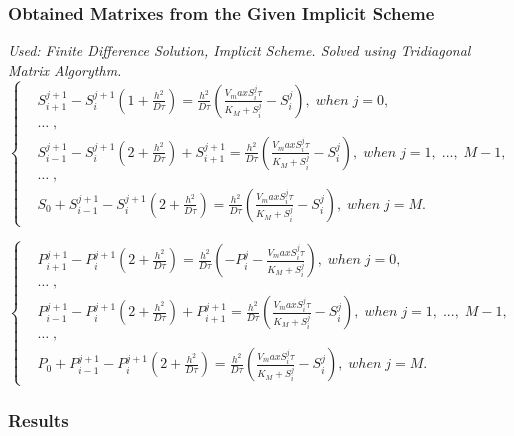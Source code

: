 \documentclass[12pt, a4paper, lithuanian]{article}
\begin{document}
\subsubsection{Obtained Matrixes from the Given Implicit Scheme}
\textit{Used: Finite Difference Solution, Implicit Scheme. Solved using Tridiagonal Matrix
Algorythm.}
\begin{equation}
\left\{
\begin{aligned}
    &S_{i+1}^{j+1}-S_i^{j+1}\left(1+\frac{h^2}{D\tau}\right)
        = \frac{h^2}{D\tau} \left(\frac{V_maxS_i^j\tau}{K_M+S_i^j}-S_i^j\right),\; when \; j = 0,\\
    &\dots\;,\\
    &S_{i-1}^{j+1}-S_i^{j+1}\left(2+\frac{h^2}{D\tau}\right)+S_{i+1}^{j+1}
        = \frac{h^2}{D\tau}
        \left(\frac{V_maxS_i^j\tau}{K_M+S_i^j}-S_i^j\right),\; when\; j =
        1,\;...,\;M-1,\\
    &\dots\;,\\
    &S_0 + S_{i-1}^{j+1} - S_i^{j+1}\left(2+\frac{h^2}{D\tau}\right)
        =  \frac{h^2}{D\tau}
        \left(\frac{V_maxS_i^j\tau}{K_M+S_i^j}-S_i^j\right),\; when \; j = M.
\end{aligned}
\right.
\end{equation}

\begin{equation}
\left\{
\begin{aligned}
    &P_{i+1}^{j+1}-P_i^{j+1}\left(2+\frac{h^2}{D\tau}\right)
        = \frac{h^2}{D\tau} \left(-P_i^j -\frac{V_maxS_i^j\tau}{K_M+S_i^j}\right),\; when \; j = 0,\\
    &\dots\;,\\
    &P_{i-1}^{j+1}-P_i^{j+1}\left(2+\frac{h^2}{D\tau}\right)+P_{i+1}^{j+1}
        = \frac{h^2}{D\tau}
        \left(\frac{V_maxS_i^j\tau}{K_M+S_i^j}-S_i^j\right),\; when\; j =
        1,\;...,\;M-1,\\
    &\dots\;,\\
    &P_0 + P_{i-1}^{j+1} - P_i^{j+1}\left(2+\frac{h^2}{D\tau}\right)
        =  \frac{h^2}{D\tau}
        \left(\frac{V_maxS_i^j\tau}{K_M+S_i^j}-S_i^j\right),\; when \; j = M.
\end{aligned}
\right.
\end{equation}

\subsubsection{Results}
\end{document}
